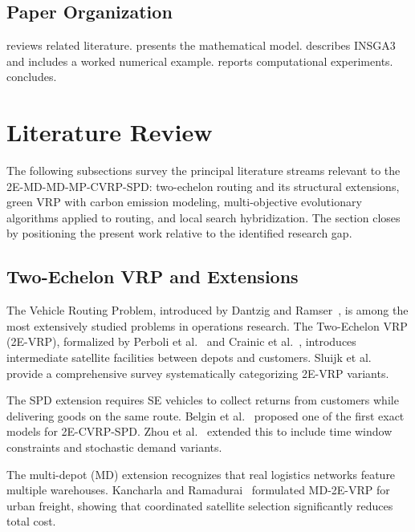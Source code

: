 \documentclass[11pt, a4paper]{article}
\numberwithin{equation}{section}
\begin{document}
\subsection{Paper Organization}

 reviews related literature.   presents the
mathematical model.   describes INSGA3 and includes a worked
numerical example.   reports computational experiments.
 concludes.

\section{Literature Review}
\label{sec:lit}

The following subsections survey the principal literature streams relevant to
the 2E-MD-MD-MP-CVRP-SPD: two-echelon routing and its structural extensions,
green VRP with carbon emission modeling, multi-objective evolutionary
algorithms applied to routing, and local search hybridization.  The section
closes by positioning the present work relative to the identified research gap.

\subsection{Two-Echelon VRP and Extensions}

The Vehicle Routing Problem, introduced by Dantzig and
Ramser~\cite{dantzig1959}, is among the most extensively studied problems in
operations research.  The Two-Echelon VRP (2E-VRP), formalized by
Perboli et al.~\cite{perboli2011} and Crainic et al.~\cite{crainic2011},
introduces intermediate satellite facilities between depots and customers.
Sluijk et al.~\cite{sluijk2023} provide a comprehensive survey systematically
categorizing 2E-VRP variants.

The SPD extension requires SE vehicles to collect returns from customers while
delivering goods on the same route.  Belgin et al.~\cite{belgin2018} proposed
one of the first exact models for 2E-CVRP-SPD\@.  Zhou
et al.~\cite{zhou2022spd} extended this to include time window constraints
and stochastic demand variants.

The multi-depot (MD) extension recognizes that real logistics networks feature
multiple warehouses.  Kancharla and Ramadurai~\cite{kancharla2019} formulated
MD-2E-VRP for urban freight, showing that coordinated satellite selection
significantly reduces total cost.
\end{document}
